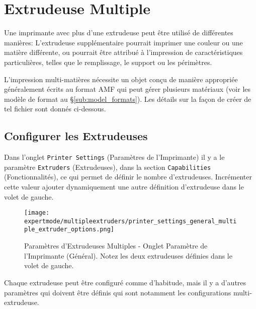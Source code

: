 
\section{Extrudeuse Multiple} %
\label{sec:multiple_extruders}

Une imprimante avec plus d'une extrudeuse peut \^etre utilis\'e de diff\'erentes mani\`eres: L'extrudeuse suppl\'ementaire pourrait imprimer une couleur ou une mati\`ere diff\'erente, ou pourrait \^etre attribu\'e \`a l'impression de caract\'eristiques particuli\`eres, telles que le remplissage, le support ou les p\'erim\`etres.

L'impression multi-mati\`eres n\'ecessite un objet conçu de mani\`ere appropri\'ee g\'en\'eralement \'ecrits au format AMF qui peut g\'erer plusieurs mat\'eriaux (voir les mod\`ele de format au §\ref{sub:model_formats}).  Les d\'etails sur la façon de cr\'eer de tel fichier sont donn\'es ci-dessous.


\subsection{Configurer les Extrudeuses} %
\label{sub:configuring_extruders}

Dans l'onglet \texttt{Printer Settings} (Param\`etres de l'Imprimante) il y a le param\`etre \texttt{Extruders} (Extrudeuses), dans la section \texttt{Capabilities} (Fonctionnalit\'es), ce qui permet de d\'efinir le nombre d'extrudeuses. Incr\'ementer cette valeur ajouter dynamiquement une autre d\'efinition d'extrudeuse dans le volet de gauche.

\begin{figure}[H]
\centering
\texttt{[image: expertmode/multipleextruders/printer\_settings\_general\_multiple\_extruder\_options.png]}
\caption{Param\`etres d'Extrudeuses Multiples - Onglet Param\`etre de l'Imprimante (G\'en\'eral).  Notez les deux extrudeuses d\'efinies dans le volet de gauche.}
\label{fig:printer_settings_general_multiple_extruder_options}
\end{figure}

Chaque extrudeuse peut \^etre configur\'e comme d'habitude, mais il y a d'autres param\`etres qui doivent \^etre d\'efinis qui sont notamment les configurations multi-extrudeuse.

